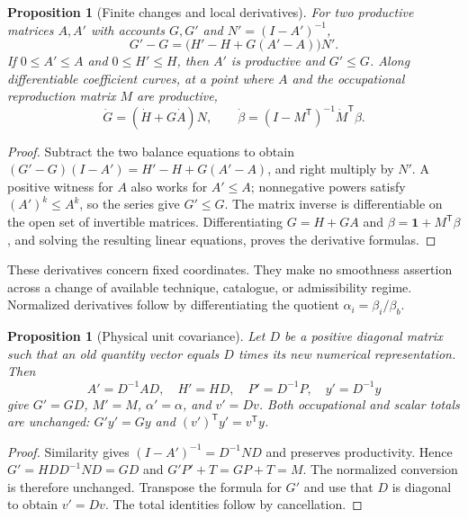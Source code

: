 \documentclass[11pt,a4paper]{article}
\newtheorem{proposition}[theorem]{Proposition}
\begin{document}
\begin{proposition}[Finite changes and local derivatives]
For two productive matrices $A,A'$ with accounts $G,G'$ and $N'=(I-A')^{-1}$,
\begin{equation}
G'-G=\bigl(H'-H+G(A'-A)\bigr)N'.
\end{equation}
If $0\leq A'\leq A$ and $0\leq H'\leq H$, then $A'$ is productive and $G'\leq G$. Along differentiable coefficient curves, at a point where $A$ and the occupational reproduction matrix $M$ are productive,
\begin{equation}
\dot G=(\dot H+G\dot A)N,\qquad
\dot\beta=(I-M^{\mathsf T})^{-1}\dot M^{\mathsf T}\beta.
\end{equation}
\end{proposition}
\begin{proof}
Subtract the two balance equations to obtain $(G'-G)(I-A')=H'-H+G(A'-A)$, and right multiply by $N'$. A positive witness for $A$ also works for $A'\leq A$; nonnegative powers satisfy $(A')^k\leq A^k$, so the series give $G'\leq G$. The matrix inverse is differentiable on the open set of invertible matrices. Differentiating $G=H+GA$ and $\beta=\mathbf1+M^{\mathsf T}\beta$, and solving the resulting linear equations, proves the derivative formulas.
\end{proof}

These derivatives concern fixed coordinates. They make no smoothness assertion across a change of available technique, catalogue, or admissibility regime. Normalized derivatives follow by differentiating the quotient $\alpha_i=\beta_i/\beta_b$.

\begin{proposition}[Physical unit covariance]
Let $D$ be a positive diagonal matrix such that an old quantity vector equals $D$ times its new numerical representation. Then
\begin{equation}
A'=D^{-1}AD,\quad H'=HD,\quad P'=D^{-1}P,\quad y'=D^{-1}y
\end{equation}
give $G'=GD$, $M'=M$, $\alpha'=\alpha$, and $v'=Dv$. Both occupational and scalar totals are unchanged: $G'y'=Gy$ and $(v')^{\mathsf T}y'=v^{\mathsf T}y$.
\end{proposition}
\begin{proof}
Similarity gives $(I-A')^{-1}=D^{-1}ND$ and preserves productivity. Hence $G'=HD D^{-1}ND=GD$ and $G'P'+T=GP+T=M$. The normalized conversion is therefore unchanged. Transpose the formula for $G'$ and use that $D$ is diagonal to obtain $v'=Dv$. The total identities follow by cancellation.
\end{proof}
\end{document}
